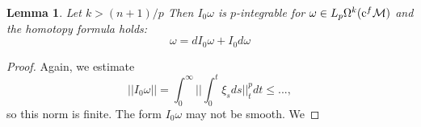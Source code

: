 \documentclass[licencjacka]{pracamgr}
\theoremstyle{definition}
\theoremstyle{definition}
\theoremstyle{plain}
\newtheorem{lemma}{Lemma}[section]
\theoremstyle{plain}
\def\cfm{\ensuremath\mathrm{c}^f\mathcal{M}}
\begin{document}
\begin{lemma} %
  Let $k > (n+1)/p$ Then $I_0 \omega $ is $p$-integrable for 
$\omega \in L_p \Omega^k(\cfm)$ and the homotopy formula holds:
\[
    \omega = d I_0 \omega + I_0 d \omega
\]
\end{lemma}
\begin{proof}
  Again, we estimate 
\[
    ||I_0 \omega|| = \int_0^\infty ||\int_0^t \xi_s ds||_t^p dt \leq
    ...,
\]
so this norm is finite. The form $I_0 \omega$ may not be smooth. We
\end{proof}








\end{document}

